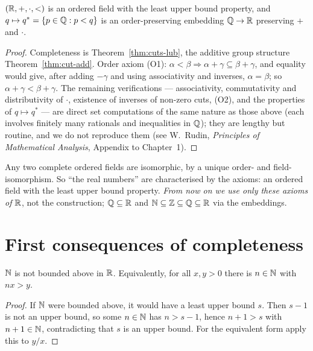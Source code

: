\begin{theorem}\label{thm:R}
	$(\mathbb{R},+,\cdot,<)$ is an ordered field with the least upper bound property, and $q\mapsto q^*=\{p\in\mathbb{Q}:p<q\}$ is an order-preserving embedding $\mathbb{Q}\to\mathbb{R}$ preserving $+$ and $\cdot$.
\end{theorem}
\begin{proof}
	Completeness is Theorem~\ref{thm:cuts-lub}, the additive group structure Theorem~\ref{thm:cut-add}. Order axiom (O1): $\alpha<\beta\Rightarrow\alpha+\gamma\subseteq\beta+\gamma$, and equality would give, after adding $-\gamma$ and using associativity and inverses, $\alpha=\beta$; so $\alpha+\gamma<\beta+\gamma$. The remaining verifications --- associativity, commutativity and distributivity of $\cdot$, existence of inverses of non-zero cuts, (O2), and the properties of $q\mapsto q^*$ --- are direct set computations of the same nature as those above (each involves finitely many rationals and inequalities in $\mathbb{Q}$); they are lengthy but routine, and we do not reproduce them (see W.\ Rudin, \emph{Principles of Mathematical Analysis}, Appendix to Chapter~1).
\end{proof}

\begin{remark}
	Any two complete ordered fields are isomorphic, by a unique order- and field-isomorphism. So ``the real numbers'' are characterised by the axioms: an ordered field with the least upper bound property. \emph{From now on we use only these axioms of $\mathbb{R}$}, not the construction; $\mathbb{Q}\subseteq\mathbb{R}$ and $\mathbb{N}\subseteq\mathbb{Z}\subseteq\mathbb{Q}\subseteq\mathbb{R}$ via the embeddings.
\end{remark}

\section{First consequences of completeness}

\begin{theorem}\label{thm:arch}
	$\mathbb{N}$ is not bounded above in $\mathbb{R}$. Equivalently, for all $x,y>0$ there is $n\in\mathbb{N}$ with $nx>y$.
\end{theorem}
\begin{proof}
	If $\mathbb{N}$ were bounded above, it would have a least upper bound $s$. Then $s-1$ is not an upper bound, so some $n\in\mathbb{N}$ has $n>s-1$, hence $n+1>s$ with $n+1\in\mathbb{N}$, contradicting that $s$ is an upper bound. For the equivalent form apply this to $y/x$.
\end{proof}

